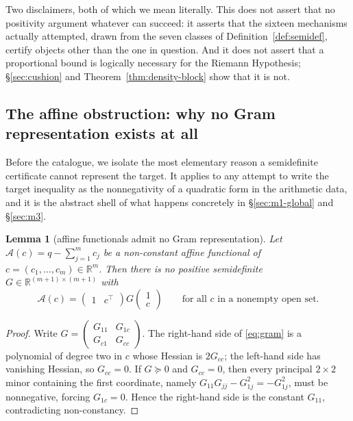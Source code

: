 \documentclass[11pt]{amsart}
\newtheorem{lemma}[theorem]{Lemma}
\theoremstyle{definition}
\theoremstyle{remark}
\theoremstyle{definition}
\newcommand{\R}{\mathbb{R}}
\begin{document}
Two disclaimers, both of which we mean literally. This does not assert that no positivity
argument whatever can succeed: it asserts that the sixteen mechanisms actually attempted, drawn from the seven classes of Definition~\ref{def:semidef}, certify
objects other than the one in question. And it does not assert that a proportional bound is
logically necessary for the Riemann Hypothesis; \S\ref{sec:cushion} and
Theorem~\ref{thm:density-block} show that it is not.

\subsection{The affine obstruction: why no Gram representation exists at all}

Before the catalogue, we isolate the most elementary reason a semidefinite certificate cannot
represent the target. It applies to any attempt to write the target inequality as the
nonnegativity of a quadratic form in the arithmetic data, and it is the abstract shell of what
happens concretely in \S\ref{sec:m1-global} and \S\ref{sec:m3}.

\begin{lemma}[affine functionals admit no Gram representation]\label{lem:affine-gram}
Let $\mathcal A(c)=q-\sum_{j=1}^mc_j$ be a non-constant affine functional of
$c=(c_1,\dots,c_m)\in\R^m$. Then there is no positive semidefinite
$G\in\R^{(m+1)\times(m+1)}$ with
\begin{equation}\label{eq:gram}
   \mathcal A(c)=\begin{pmatrix}1&c^{\!\top}\end{pmatrix}
   G\begin{pmatrix}1\\ c\end{pmatrix}
   \qquad\text{for all }c\text{ in a nonempty open set.}
\end{equation}
\end{lemma}

\begin{proof}
Write $G=\begin{pmatrix}G_{11}&G_{1c}\\ G_{c1}&G_{cc}\end{pmatrix}$. The right-hand side of
\eqref{eq:gram} is a polynomial of degree two in $c$ whose Hessian is $2G_{cc}$; the left-hand
side has vanishing Hessian, so $G_{cc}=0$. If $G\succeq0$ and $G_{cc}=0$, then every principal
$2\times2$ minor containing the first coordinate, namely
$G_{11}G_{jj}-G_{1j}^2=-G_{1j}^2$, must be nonnegative, forcing $G_{1c}=0$. Hence the
right-hand side is the constant $G_{11}$, contradicting non-constancy.
\end{proof}
\end{document}
